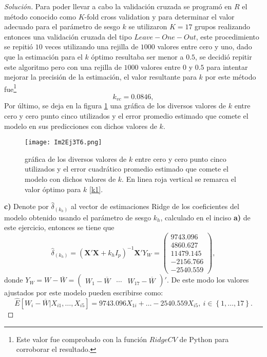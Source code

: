 \documentclass[10.5pt,notitlepage]{article}
\newenvironment{solucion}
  {\begin{proof}[Solución]}
  {\end{proof}}
\newcommand{\kis}[1]{\left\{ #1 \right\}}
\theoremstyle{plain}
\begin{document}
\begin{solucion}
Para poder llevar a cabo la validación cruzada se programó en \(R\) el método conocido como \(K\)-fold cross validation y para determinar el valor adecuado para el parámetro de sesgo \(\mathit{k}\) se utilizaron \(K = 17\) grupos realizando entonces una validación cruzada del tipo \(Leave-One-Out\), este procedimiento se repitió \(10\) veces utilizando una rejilla de \(1000\) valores entre cero y uno, dado que la estimación para el \(k\) óptimo resultaba ser menor a \(0.5\), se decidió repitir este algoritmo pero con una rejilla de \(1000\) valores entre \(0\) y \(0.5\) para intentar mejorar la precisión de la estimación, el valor resultante para \(k\) por este método fue\footnote{Este valor fue comprobado con la función \(RidgeCV\) de Python para corroborar el resultado.} 
\begin{equation}\label{k1}
    \mathit{k}_{vc} = 0.0846,
\end{equation}
Por último, se deja en la figura \ref{fig:10} una gráfica de los diversos valores de \(\mathit{k}\) entre cero y cero punto cinco utilizados y el error promedio estimado que comete el modelo en sus predicciones con dichos valores de \(\mathit{k}\).\\ 
\begin{figure}[htb]
 \centering
 \texttt{[image: Im2Ej3T6.png]}
 \caption{gráfica de los diversos valores de \(\mathit{k}\) entre cero y cero punto cinco utilizados y el error cuadrático promedio estimado que comete el modelo con dichos valores de \(\mathit{k}\). En linea roja vertical se remarca el valor óptimo para \(k\) \eqref{k1}.}
\label{fig:10}
\end{figure}

\noindent \textbf{c)} Denote por \(\hat{\delta}_{(k_{h})}\) al vector de estimaciones Ridge de los coeficientes del modelo obtenido usando el parámetro de sesgo \(k_h\), calculado en el inciso \textbf{a)} de este ejercicio, entonces se tiene que
\begin{equation*}
    \hat{\delta}_{(k_{h})} = (\mathbf{X}'\mathbf{X} + k_h I_{p})^{-1}\mathbf{X}'Y_{W} =  \begin{pmatrix}  9743.096\\
   4860.627\\
  11479.145\\
  -2156.766\\
  -2540.559\end{pmatrix},
\end{equation*}
donde \(Y_{W} = W - \overline{W} = \begin{pmatrix}W_{1} - \overline{W} & \cdots & W_{17} - \overline{W} \end{pmatrix}'\). De este modo los valores ajustados por este modelo pueden escribirse como:
\begin{equation}\label{Mod kh}
      \widehat{E}[W_{i} - \overline{W}| X_{i1}, \hdots, X_{i5}] =  9743.096 X_{1i} + \hdots-2540.559 X_{i5}, \ i \in \kis{1, \hdots, 17}.
\end{equation}


\end{solucion}
\end{document}
